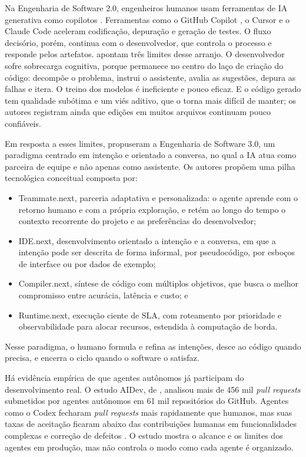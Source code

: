Na Engenharia de Software 2.0, engenheiros humanos usam ferramentas de IA generativa como copilotos \citep{ES302024}. Ferramentas como o GitHub Copilot \citep{GitHubCopilot2024}, o Cursor \citep{Cursor2022} e o Claude Code \citep{ClaudeCode2025} aceleram codificação, depuração e geração de testes. O fluxo decisório, porém, continua com o desenvolvedor, que controla o processo e responde pelos artefatos. \cite{ES302024} apontam três limites desse arranjo. O desenvolvedor sofre sobrecarga cognitiva, porque permanece no centro do laço de criação do código: decompõe o problema, instrui o assistente, avalia as sugestões, depura as falhas e itera. O treino dos modelos é ineficiente e pouco eficaz. E o código gerado tem qualidade subótima e um viés aditivo, que o torna mais difícil de manter; os autores registram ainda que edições em muitos arquivos continuam pouco confiáveis.

Em resposta a esses limites, \cite{ES302024} propuseram a Engenharia de Software 3.0, um paradigma centrado em intenção e orientado a conversa, no qual a IA atua como parceira de equipe e não apenas como assistente. Os autores propõem uma pilha tecnológica conceitual composta por:
\begin{itemize}
    \item Teammate.next, parceria adaptativa e personalizada: o agente aprende com o retorno humano e com a própria exploração, e retém ao longo do tempo o contexto recorrente do projeto e as preferências do desenvolvedor;
    \item IDE.next, desenvolvimento orientado a intenção e a conversa, em que a intenção pode ser descrita de forma informal, por pseudocódigo, por esboços de interface ou por dados de exemplo;
    \item Compiler.next, síntese de código com múltiplos objetivos, que busca o melhor compromisso entre acurácia, latência e custo; e
    \item Runtime.next, execução ciente de SLA, com roteamento por prioridade e observabilidade para alocar recursos, estendida à computação de borda.
\end{itemize}
Nesse paradigma, o humano formula e refina as intenções, desce ao código quando precisa, e encerra o ciclo quando o software o satisfaz.

Há evidência empírica de que agentes autônomos já participam do desenvolvimento real. O estudo AIDev, de \cite{AIDEV2025}, analisou mais de 456 mil \textit{pull requests} submetidos por agentes autônomos em 61 mil repositórios do GitHub. Agentes como o Codex \citep{Codex2025} fecharam \textit{pull requests} mais rapidamente que humanos, mas suas taxas de aceitação ficaram abaixo das contribuições humanas em funcionalidades complexas e correção de defeitos \citep{AIDEV2025}. O estudo mostra o alcance e os limites dos agentes em produção, mas não controla o modo como cada agente é organizado.

